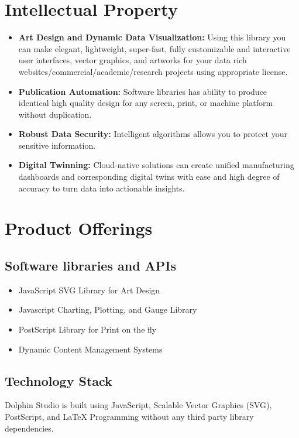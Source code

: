 \documentclass{amm-pst-report}
\begin{document}
\section{Intellectual Property}
\begin{itemize}[itemsep=10pt]

\item \textbf{Art Design and Dynamic Data Visualization:} Using this library you can make elegant, lightweight, super-fast, fully customizable and interactive user interfaces, vector graphics, and artworks for your data rich websites/commercial/academic/research projects using appropriate license.

\item \textbf{Publication Automation:} Software libraries has ability to produce identical high quality design for any screen, print, or machine platform without duplication.

\item \textbf{Robust Data Security:} Intelligent algorithms allows you to protect your sensitive information.

\item \textbf{Digital Twinning:} Cloud-native solutions can create unified  manufacturing dashboards and corresponding digital twins with ease and high degree of accuracy to turn data into actionable insights.

\end{itemize}



\section{Product Offerings}
\subsection{Software libraries and APIs}
\begin{itemize}
\item JavaScript SVG Library for Art Design
\item Javascript Charting, Plotting, and Gauge Library
\item PostScript Library for Print on the fly
\item Dynamic Content Management Systems
\end{itemize}

\subsection{Technology Stack}
Dolphin Studio is built using JavaScript, Scalable Vector Graphics (SVG), PostScript, and LaTeX Programming without any third party library dependencies.
\end{document}
